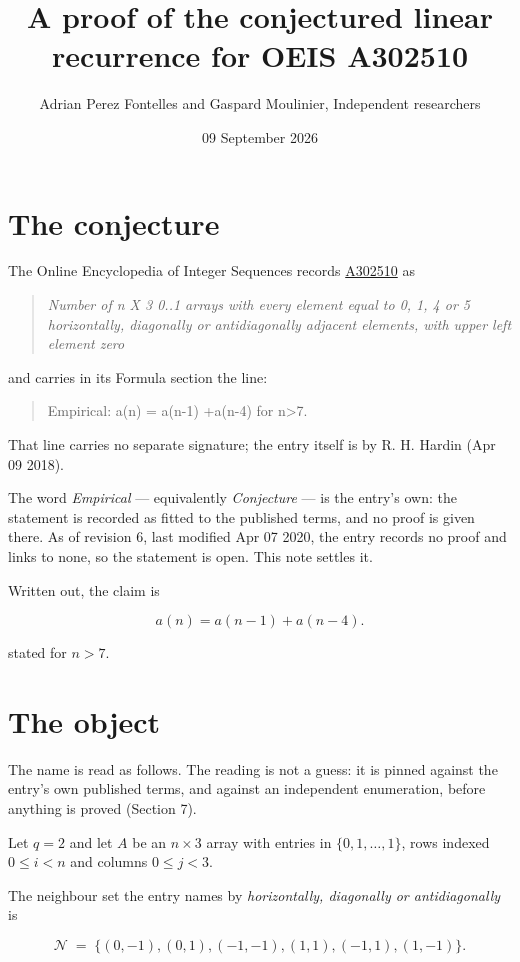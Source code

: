 \documentclass[11pt]{article}
\title{A proof of the conjectured linear recurrence for OEIS A302510}
\author{Adrian Perez Fontelles and Gaspard Moulinier, Independent researchers}
\date{09 September 2026}
\theoremstyle{definition}
\begin{document}
\maketitle
\section{The conjecture}

The Online Encyclopedia of Integer Sequences records \href{https://oeis.org/A302510}{A302510} as

\begin{quote}\itshape Number of n X 3 0..1 arrays with every element equal to 0, 1, 4 or 5 horizontally, diagonally or antidiagonally adjacent elements, with upper left element zero\end{quote}

and carries in its Formula section the line:

\begin{quote}\ttfamily Empirical: a(n) = a(n-1) +a(n-4) for n>7.\end{quote}

That line carries no separate signature; the entry itself is by R. H. Hardin (Apr 09 2018).

The word {\itshape Empirical} --- equivalently {\itshape Conjecture} --- is the entry's own: the statement is recorded as fitted to the published terms, and no proof is given there. As of revision 6, last modified Apr 07 2020, the entry records no proof and links to none, so the statement is open. This note settles it.

Written out, the claim is

\[a(n) = a(n-1) + a(n-4).\]

stated for $n > 7$.

\section{The object}

The name is read as follows. The reading is not a guess: it is pinned against the entry's own published terms, and against an independent enumeration, before anything is proved (Section 7).

Let $q = 2$ and let $A$ be an $n \times 3$ array with entries in $\{0,1,\dots,1\}$, rows indexed $0 \le i < n$ and columns $0 \le j < 3$.

The neighbour set the entry names by {\itshape horizontally, diagonally or antidiagonally} is

\[\mathcal{N} \;=\; \{(0,-1), (0,1), (-1,-1), (1,1), (-1,1), (1,-1)\}.\]
\end{document}
